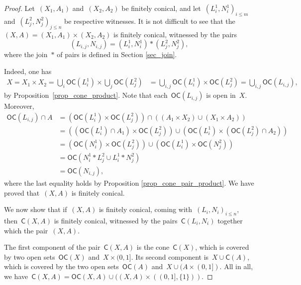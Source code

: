 \documentclass[english,11pt]{article}
\theoremstyle{plain}
\theoremstyle{remark}
\theoremstyle{definition}
\newcommand{\C}[1]{\mathsf{C}(#1)}%
\newcommand{\OC}[1]{\mathsf{OC}(#1)}%
\begin{document}
\begin{proof}
Let~$(X_1,A_1)$ and~$(X_2,A_2)$ be finitely conical, and let~$(L_{i}^1,N_{i}^1)_{i\leq m}$ and~$(L_j^2,N_j^2)_{j\leq n}$ be respective witnesses. It is not difficult to see that the~$(X,A)=(X_1,A_1)\times (X_2,A_2)$ is finitely conical, witnessed by the pairs
\begin{equation*}
(L_{i,j},N_{i,j})=(L^1_i,N^1_i)*(L^2_j,N^2_j),
\end{equation*}
where the join~$*$ of pairs is defined in Section \ref{sec_join}.

Indeed, one has
\begin{align*}
X =X_{1}\times X_{2}=\bigcup_{i}\OC{L_{i}^{1}}\times \bigcup_{j}\OC{L_{j}^{2}}& =\bigcup_{i,j}\OC{L_{i}^{1}}\times\OC{L_{j}^{2}} =\bigcup_{i,j}\OC{L_{i,j}},
\end{align*}
by Proposition~\ref{prop_cone_product}. Note that each~$\OC{L_{i,j}}$ is open in~$X$. Moreover,
\begin{align*}
\OC{L_{i,j}}\cap A & =(\OC{L_{i}^{1}}\times\OC{L_{j}^{2}})\cap((A_{1}\times X_{2})\cup(X_{1}\times A_{2}))\\
 & =((\OC{L_{i}^{1}}\cap A_{1})\times\OC{L_{j}^{2}})\cup(\OC{L_{i}^{1}}\times(\OC{L_{j}^{2}}\cap A_{2}))\\
 & =(\OC{N_{i}^{1}}\times\OC{L_{j}^{2}})\cup(\OC{L_{i}^{1}}\times\OC{N_{j}^{2}})\\
 &=\OC{N_i^1*L^2_j\cup L^1_i*N^2_j}\\
 & =\OC{N_{i,j}},
\end{align*}
where the last equality holds by Proposition \ref{prop_cone_pair_product}. We have proved that~$(X,A)$ is finitely conical.

We now show that if~$(X,A)$ is finitely conical, coming with~$(L_{i},N_{i})_{i\leq n}$, then~$\C{X,A}$ is finitely conical, witnessed by the pairs~$\C{L_i,N_i}$ together which the pair~$(X,A)$.

The first component of the pair~$\C{X,A}$ is the cone~$\C{X}$, which is covered by two open sets~$\OC{X}$ and~$X\times (0,1]$. Its second component is~$X\cup \C{A}$, which is covered by the two open sets~$\OC{A}$ and~$X\cup (A\times (0,1])$. All in all, we have~$\C{X,A}=\OC{X,A}\cup ((X,A)\times ((0,1],\{1\}))$.


\end{proof}
\end{document}
